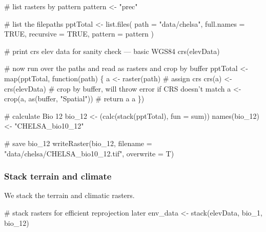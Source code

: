 \documentclass[
]{article}
\newenvironment{Shaded}{}{}
\newcommand{\CommentTok}[1]{\textcolor[rgb]{0.00,0.50,0.00}{#1}}
\newcommand{\ControlFlowTok}[1]{\textcolor[rgb]{0.00,0.00,1.00}{#1}}
\newcommand{\DataTypeTok}[1]{#1}
\newcommand{\DecValTok}[1]{#1}
\newcommand{\KeywordTok}[1]{\textcolor[rgb]{0.00,0.00,1.00}{#1}}
\newcommand{\NormalTok}[1]{#1}
\newcommand{\OtherTok}[1]{\textcolor[rgb]{1.00,0.25,0.00}{#1}}
\newcommand{\StringTok}[1]{\textcolor[rgb]{0.00,0.50,0.50}{#1}}
\begin{document}
\begin{Shaded}
\begin{Highlighting}[]
\CommentTok{# list rasters by pattern}
\NormalTok{pattern <-}\StringTok{ "prec"}

\CommentTok{# list the filepaths}
\NormalTok{pptTotal <-}\StringTok{ }\KeywordTok{list.files}\NormalTok{(}
  \DataTypeTok{path =} \StringTok{"data/chelsa"}\NormalTok{,}
  \DataTypeTok{full.names =} \OtherTok{TRUE}\NormalTok{,}
  \DataTypeTok{recursive =} \OtherTok{TRUE}\NormalTok{,}
  \DataTypeTok{pattern =}\NormalTok{ pattern}
\NormalTok{)}

\CommentTok{# print crs elev data for sanity check --- basic WGS84}
\KeywordTok{crs}\NormalTok{(elevData)}

\CommentTok{# now run over the paths and read as rasters and crop by buffer}
\NormalTok{pptTotal <-}\StringTok{ }\KeywordTok{map}\NormalTok{(pptTotal, }\ControlFlowTok{function}\NormalTok{(path) \{}
\NormalTok{  a <-}\StringTok{ }\KeywordTok{raster}\NormalTok{(path)}
  \CommentTok{# assign crs}
  \KeywordTok{crs}\NormalTok{(a) <-}\StringTok{ }\KeywordTok{crs}\NormalTok{(elevData)}
  \CommentTok{# crop by buffer, will throw error if CRS doesn't match}
\NormalTok{  a <-}\StringTok{ }\KeywordTok{crop}\NormalTok{(a, }\KeywordTok{as}\NormalTok{(buffer, }\StringTok{"Spatial"}\NormalTok{))}
  \CommentTok{# return a}
\NormalTok{  a}
\NormalTok{\})}

\CommentTok{# calculate Bio 12}
\NormalTok{bio_}\DecValTok{12}\NormalTok{ <-}\StringTok{ }\NormalTok{(}\KeywordTok{calc}\NormalTok{(}\KeywordTok{stack}\NormalTok{(pptTotal), }\DataTypeTok{fun =}\NormalTok{ sum))}
\KeywordTok{names}\NormalTok{(bio_}\DecValTok{12}\NormalTok{) <-}\StringTok{ "CHELSA_bio10_12"}

\CommentTok{# save bio_12}
\KeywordTok{writeRaster}\NormalTok{(bio_}\DecValTok{12}\NormalTok{, }\DataTypeTok{filename =} \StringTok{"data/chelsa/CHELSA_bio10_12.tif"}\NormalTok{, }\DataTypeTok{overwrite =}\NormalTok{ T)}
\end{Highlighting}
\end{Shaded}

\hypertarget{stack-terrain-and-climate}{%
\subsubsection{Stack terrain and climate}\label{stack-terrain-and-climate}}

We stack the terrain and climatic rasters.

\begin{Shaded}
\begin{Highlighting}[]
\CommentTok{# stack rasters for efficient reprojection later}
\NormalTok{env_data <-}\StringTok{ }\KeywordTok{stack}\NormalTok{(elevData, bio_}\DecValTok{1}\NormalTok{, bio_}\DecValTok{12}\NormalTok{)}
\end{Highlighting}
\end{Shaded}
\end{document}
